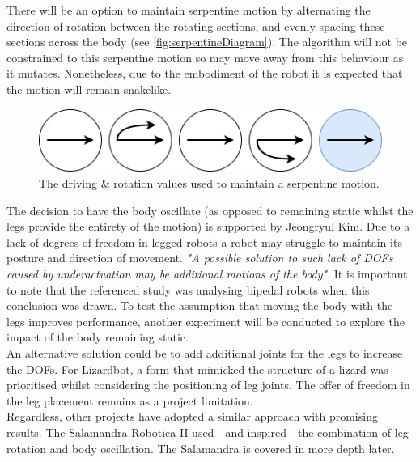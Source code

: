 \documentclass{article}
\begin{document}
There will be an option to maintain serpentine motion by alternating the direction of rotation between the rotating sections, and evenly spacing these sections across the body (see \autoref{fig:serpentineDiagram}). The algorithm will not be constrained to this serpentine motion so may move away from this behaviour as it mutates. Nonetheless, due to the embodiment of the robot it is expected that the motion will remain snakelike.\\
\begin{figure}[H]
\centering
\includegraphics[scale=0.6]{serpentineDiagram}
\caption{The driving \& rotation values used to maintain a serpentine motion.}
\label{fig:serpentineDiagram}
\end{figure}

The decision to have the body oscillate (as opposed to remaining static whilst the legs provide the entirety of the motion) is supported by Jeongryul Kim. Due to a lack of degrees of freedom in legged robots a robot may struggle to maintain its posture and direction of movement. \textit{"A possible solution to such lack of DOFs caused by underactuation may be additional motions of the body"}.  
It is important to note that the referenced study was analysing bipedal robots when this conclusion was drawn. To test the assumption that moving the body with the legs improves performance, another experiment will be conducted to explore the impact of the body remaining static. \\
An alternative solution could be to add additional joints for the legs to increase the DOFs. For Lizardbot, a form that mimicked the structure of a lizard was prioritised whilst considering the positioning of leg joints. The offer of freedom in the leg placement remains as a project limitation. \\
Regardless, other projects have adopted a similar approach with promising results. The Salamandra Robotica II used - and inspired - the combination of leg rotation and body oscillation.  The Salamandra is covered in more depth later.
\end{document}
